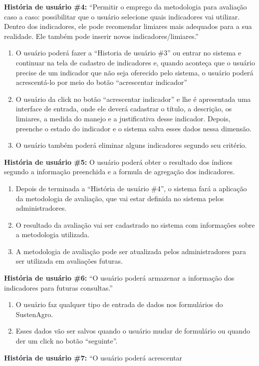 \textbf{História de usuário \#4:} “Permitir o emprego da metodologia
para avaliação caso a caso: possibilitar que o usuário selecione quais
indicadores vai utilizar. Dentro dos indicadores, ele pode recomendar
limiares mais adequados para a sua realidade. Ele também pode inserir
novos indicadores\slash{}limiares.”
\begin{enumerate}
\item O usuário poderá fazer a “Historia de usuário \#3” ou entrar no sistema
e continuar na tela de cadastro de indicadores e, quando aconteça
que o usuário precise de um indicador que não seja oferecido pelo
sistema, o usuário poderá acrescentá-lo por meio do botão “acrescentar
indicador” 
\item O usuário da click no botão “acrescentar indicador” e lhe é apresentada
uma interface de entrada, onde ele deverá cadastrar o título, a descrição,
os limiares, a medida do manejo e a justificativa desse indicador.
Depois, preenche o estado do indicador e o sistema salva esses dados
nessa dimensão. 
\item O usuário também poderá eliminar alguns indicadores segundo seu critério.
\end{enumerate}
\textbf{História de usuário \#5:} \textquotedbl{}O usuário poderá
obter o resultado dos índices segundo a informação preenchida e a
formula de agregação dos indicadores.\textquotedbl{}
\begin{enumerate}
\item Depois de terminada a “História de usuário \#4”, o sistema fará a
aplicação da metodologia de avaliação, que vai estar definida no sistema
pelos administradores. 
\item O resultado da avaliação vai ser cadastrado no sistema com informações
sobre a metodologia utilizada.
\item A metodologia de avaliação pode ser atualizada pelos administradores
para ser utilizada em avaliações futuras.
\end{enumerate}
\textbf{História de usuário \#6:} ``O usuário poderá armazenar a
informação dos indicadores para futuras consultas.''
\begin{enumerate}
\item O usuário faz qualquer tipo de entrada de dados nos formulários do
SustenAgro. 
\item Esses dados vão ser salvos quando o usuário mudar de formulário ou
quando der um click no botão ``seguinte''.
\end{enumerate}
\textbf{História de usuário \#7:} ``O usuário poderá acrescentar
